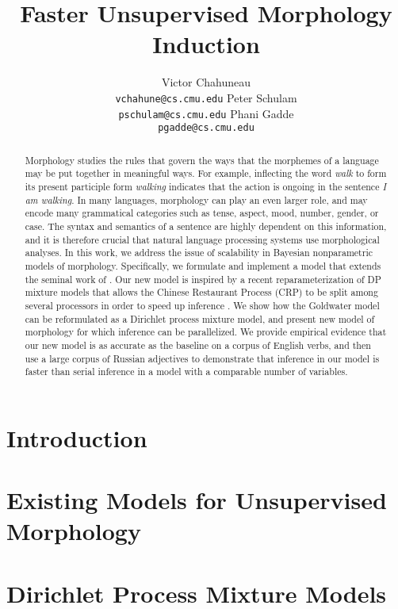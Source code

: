 \documentclass{article}
\title{Faster Unsupervised Morphology Induction}
\author{
Victor Chahuneau\\
\texttt{vchahune@cs.cmu.edu}
\And
Peter Schulam\\
\texttt{pschulam@cs.cmu.edu}
\And
Phani Gadde\\
\texttt{pgadde@cs.cmu.edu} \\
}
\begin{document}
\maketitle

\begin{abstract}
  Morphology studies the rules that govern the ways that the morphemes
  of a language may be put together in meaningful ways. For example,
  inflecting the word \textit{walk} to form its present participle
  form \textit{walking} indicates that the action is ongoing in the
  sentence \textit{I am walking}. In many languages, morphology can
  play an even larger role, and may encode many grammatical
  categories such as tense, aspect, mood, number, gender, or case. The
  syntax and semantics of a sentence are highly dependent on this
  information, and it is therefore crucial that natural language
  processing systems use morphological analyses.  In this work, we
  address the issue of scalability in Bayesian nonparametric models of
  morphology. Specifically, we formulate and implement a model that
  extends the seminal work of \cite{goldwater2011}. Our new model is
  inspired by a recent reparameterization of DP mixture models that
  allows the Chinese Restaurant Process (CRP) to be split among
  several processors in order to speed up inference
  \cite{williamson2013}. We show how the Goldwater model can be
  reformulated as a Dirichlet process mixture model, and present new
  model of morphology for which inference can be parallelized. We provide empirical evidence
  that our new model is as accurate as the baseline on a corpus of
  English verbs, and then use a large corpus of Russian adjectives to
  demonstrate that inference in our model is faster than serial
  inference in a model with a comparable number of variables.
\end{abstract}

\section{Introduction}
\label{sec:introduction}



\section{Existing Models for Unsupervised Morphology}
\label{sec:existing-models}



\section{Dirichlet Process Mixture Models}
\label{sec:dpmm}
\end{document}
